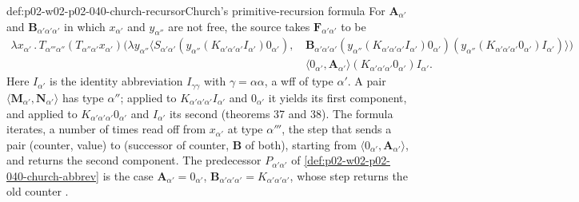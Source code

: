 \begin{hbdefinition}{def:p02-w02-p02-040-church-recursor}{Church's primitive-recursion formula}
For \(\mathbf A_{\alpha'}\) and \(\mathbf B_{\alpha'\alpha'\alpha'}\) in which
\(x_{\alpha'}\) and \(y_{\alpha''}\) are not free, the source takes
\(\mathbf F_{\alpha'\alpha'}\) to be \cite[\S8, p.~68]{Church1940}
\[
\begin{aligned}
 \lambda x_{\alpha'}\,.\,T_{\alpha'''\alpha''}(T_{\alpha''\alpha'}x_{\alpha'})
 (\lambda y_{\alpha''}\langle S_{\alpha'\alpha'}(y_{\alpha''}(K_{\alpha'\alpha'\alpha'}I_{\alpha'})0_{\alpha'}),\,
 &\mathbf B_{\alpha'\alpha'\alpha'}(y_{\alpha''}(K_{\alpha'\alpha'\alpha'}I_{\alpha'})0_{\alpha'})
 (y_{\alpha''}(K_{\alpha'\alpha'\alpha'}0_{\alpha'})I_{\alpha'})\rangle)\\
 &\langle0_{\alpha'},\mathbf A_{\alpha'}\rangle(K_{\alpha'\alpha'\alpha'}0_{\alpha'})I_{\alpha'}.
\end{aligned}
\]
Here \(I_{\alpha'}\) is the identity abbreviation \(I_{\gamma\gamma}\) with
\(\gamma=\alpha\alpha\), a wff of type \(\alpha'\).  A pair
\(\langle\mathbf M_{\alpha'},\mathbf N_{\alpha'}\rangle\) has type \(\alpha''\);
applied to \(K_{\alpha'\alpha'\alpha'}I_{\alpha'}\) and \(0_{\alpha'}\) it yields
its first component, and applied to \(K_{\alpha'\alpha'\alpha'}0_{\alpha'}\) and
\(I_{\alpha'}\) its second (theorems 37 and 38).  The formula iterates, a number
of times read off from \(x_{\alpha'}\) at type \(\alpha'''\), the step that
sends a pair (counter, value) to (successor of counter, \(\mathbf B\) of
both), starting from \(\langle0_{\alpha'},\mathbf A_{\alpha'}\rangle\), and
returns the second component.  The predecessor \(P_{\alpha'\alpha'}\) of
\cref{def:p02-w02-p02-040-church-abbrev} is the case
\(\mathbf A_{\alpha'}=0_{\alpha'}\), \(\mathbf B_{\alpha'\alpha'\alpha'}=K_{\alpha'\alpha'\alpha'}\),
whose step returns the old counter \cite[\S8, p.~68]{Church1940}.
\end{hbdefinition}

